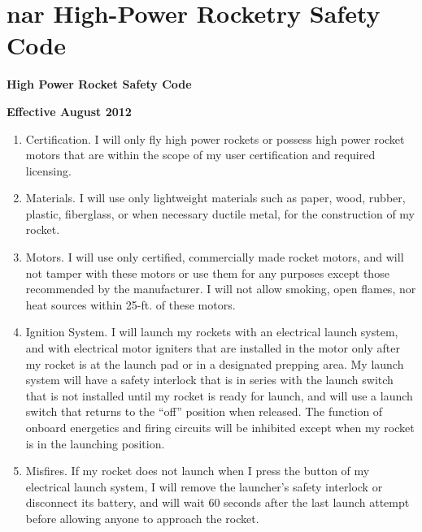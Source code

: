 \chapter[NAR High-Power Rocketry Safety Code]{\gls{nar} High-Power Rocketry Safety Code}\label{App:Safety:NARCode}

\begin{center}
\textbf{High Power Rocket Safety Code}
\end{center}\par

\begin{center}
\textbf{Effective August 2012}
\end{center}\par

\setlength{\parskip}{8.04pt}
\begin{enumerate}
	\item Certification. I will only fly high power rockets or possess high power rocket motors that are within the scope of my user certification and required licensing.\par

	\item Materials. I will use only lightweight materials such as paper, wood, rubber, plastic, fiberglass, or when necessary ductile metal, for the construction of my rocket.\par

	\item Motors. I will use only certified, commercially made rocket motors, and will not tamper with these motors or use them for any purposes except those recommended by the manufacturer. I will not allow smoking, open flames, nor heat sources within 25-ft. of these motors.\par

	\item Ignition System. I will launch my rockets with an electrical launch system, and with electrical motor igniters that are installed in the motor only after my rocket is at the launch pad or in a designated prepping area. My launch system will have a safety interlock that is in series with the launch switch that is not installed until my rocket is ready for launch, and will use a launch switch that returns to the ``off''  position when released. The function of onboard energetics and firing circuits will be inhibited except when my rocket is in the launching position.\par

	\item Misfires. If my rocket does not launch when I press the button of my electrical launch system, I will remove the launcher’s safety interlock or disconnect its battery, and will wait 60 seconds after the last launch attempt before allowing anyone to approach the rocket.\par


\end{enumerate}
